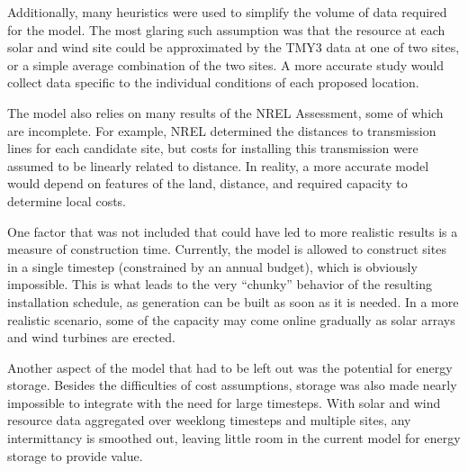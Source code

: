 \documentclass[12pt,letterpaper,fleqn]{article}
\begin{document}
Additionally, many heuristics were used to simplify the volume of data
required for the model. The most glaring such assumption was that the
resource at each solar and wind site could be approximated by the TMY3
data at one of two sites, or a simple average combination of the two
sites. A more accurate study would collect data specific to the
individual conditions of each proposed location.

The model also relies on many results of the NREL Assessment, some of
which are incomplete. For example, NREL determined the distances to
transmission lines for each candidate site, but costs for installing
this transmission were assumed to be linearly related to distance. In
reality, a more accurate model would depend on features of the land,
distance, and required capacity to determine local costs.

One factor that was not included that could have led to more realistic
results is a measure of construction time. Currently, the model is
allowed to construct sites in a single timestep (constrained by an
annual budget), which is obviously impossible. This is what leads to
the very ``chunky'' behavior of the resulting installation schedule,
as generation can be built as soon as it is needed. In a more
realistic scenario, some of the capacity may come online gradually as
solar arrays and wind turbines are erected.

Another aspect of the model that had to be left out was the potential
for energy storage. Besides the difficulties of cost assumptions,
storage was also made nearly impossible to integrate with the need for
large timesteps. With solar and wind resource data aggregated over
weeklong timesteps and multiple sites, any intermittancy is smoothed
out, leaving little room in the current model for energy storage to
provide value.
\end{document}
